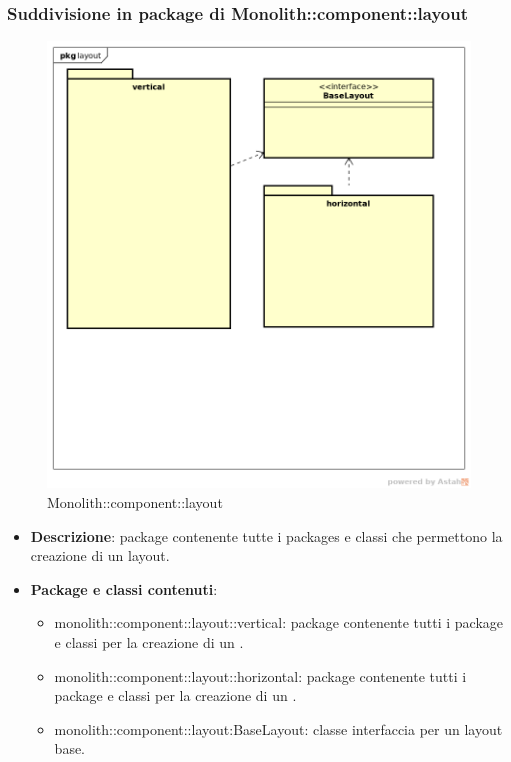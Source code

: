 \subsubsection{Suddivisione in package  di Monolith::component::layout}
\label{Monolith::component::layout}
\begin{figure}[H]
	\centering
	\includegraphics[scale=0.5]{Sezioni/imgPackage/component_layout.png}
	\caption{Monolith::component::layout}
\end{figure}
\begin{itemize}
	\item{\textbf{Descrizione}}: package contenente tutte i packages e classi che permettono la creazione di un layout.
	\item{\textbf{Package e classi contenuti}}:
	\begin{itemize}
	\item{monolith::component::layout::vertical}: package contenente tutti i package e classi per la creazione di un .
	\item{monolith::component::layout::horizontal}: package contenente tutti i package e classi per la creazione di un .
	\item{monolith::component::layout:BaseLayout}: classe interfaccia per un layout base.
	\end{itemize}
	
\end{itemize}


